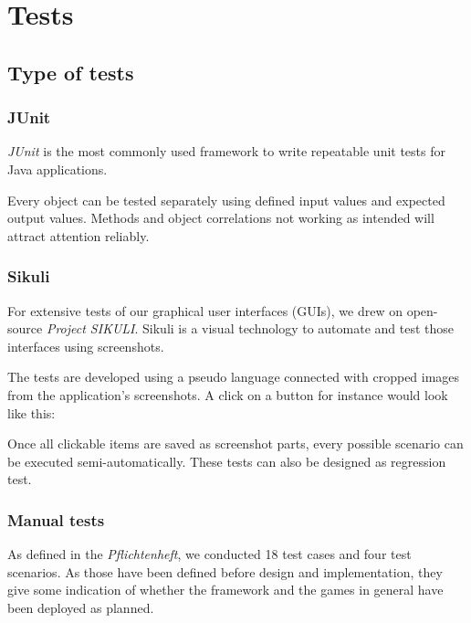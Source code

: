 \section{Tests}

\subsection{Type of tests}

\subsubsection{JUnit}

\par
\emph{JUnit} is the most commonly used framework to write repeatable unit tests for Java applications.\par
Every object can be tested separately using defined input values and expected output values. Methods and object correlations not working as intended will attract attention reliably.\par

\subsubsection{Sikuli}

\par
For extensive tests of our graphical user interfaces (GUIs), we drew on open-source \emph{Project SIKULI}. Sikuli is a visual technology to automate and test those interfaces using screenshots.\par
The tests are developed using a pseudo language connected with cropped images from the application's screenshots. A click on a button for instance would look like this:\par
{}\par
Once all clickable items are saved as screenshot parts, every possible scenario can be executed semi-automatically. These tests can also be designed as regression test.\par

\subsubsection{Manual tests}

As defined in the \emph{Pflichtenheft}, we conducted 18 test cases and four test scenarios. As those have been defined before design and implementation, they give some indication of whether the framework and the games in general have been deployed as planned.\par

